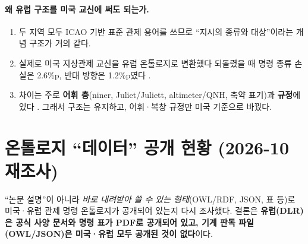 \documentclass[10pt,a4paper]{article}
\begin{document}
\paragraph{왜 유럽 구조를 미국 교신에 써도 되는가.}
\begin{enumerate}
\item 두 지역 모두 ICAO 기반 표준 관제 용어를 쓰므로 ``지시의 종류와 대상''이라는 개념 구조가 거의 같다.
\item 실제로 미국 지상관제 교신을 유럽 온톨로지로 변환했다 되돌렸을 때 명령 종류 손실은 2.6\%p, 반대 방향은 1.2\%p였다 \cite{helmke2025loss}.
\item 차이는 주로 \textbf{어휘 층}(niner, Juliet/Juliett, altimeter/QNH, 축약 표기)과 \textbf{규정}에 있다 \cite{chen2023}. 그래서 구조는 유지하고, 어휘·복창 규정만 미국 기준으로 바꿨다.
\end{enumerate}

\section{온톨로지 ``데이터'' 공개 현황 (2026-10 재조사)}\label{sec:avail}
\noindent ``논문 설명''이 아니라 \emph{바로 내려받아 쓸 수 있는 형태}(OWL/RDF, JSON, 표 등)로 미국·유럽 관제 명령 온톨로지가 공개되어 있는지 다시 조사했다. 결론은 \textbf{유럽(DLR)은 공식 사양 문서와 명령 표가 PDF로 공개되어 있고, 기계 판독 파일(OWL/JSON)은 미국·유럽 모두 공개된 것이 없다}이다.
\end{document}
